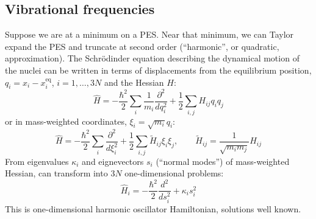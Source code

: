 \documentclass[11pt]{article}
\begin{document}
\subsection{Vibrational frequencies}
\label{sec:org332ea5d}
Suppose we are at a minimum on a PES.  Near that minimum, we can Taylor expand the PES and truncate at second order (``harmonic'', or quadratic, approximation).  The Schr\"{o}dinder equation describing the dynamical motion of the nuclei can be written in terms of displacements from the equilibrium position, \(q_i = x_i - x^\text{eq}_i\), \(i =1, \ldots, 3N\) and the Hessian \(H\):
\[\hat{H} = -\frac{\hbar^2}{2}\sum_i \frac{1}{m_i}\frac{\partial^2}{dq_i^2}+\frac{1}{2}\sum_{i,j} H_{ij} q_i q_j\]
or in mass-weighted coordinates, \(\xi_i=\sqrt{m_i}q_i\):
\[ \hat{H} = -\frac{\hbar^2}{2}\sum_i \frac{\partial^2}{d\xi_i^2}+\frac{1}{2}\sum_{i,j} \tilde{H}_{ij} \xi_i \xi_j,\qquad \tilde{H}_{ij}=\frac{1}{\sqrt{m_i m_j}}H_{ij} \]
From eigenvalues \(\kappa_i\) and eignevectors \(s_i\) (``normal modes'') of mass-weighted Hessian, can transform into \(3N\) one-dimensional problems:
\[\hat{H}_i=-\frac{\hbar^2}{2}\frac{d^2}{ds_i^2}+\kappa_is_i^2\]
This is one-dimensional harmonic oscillator Hamiltonian, solutions well known.
\end{document}
